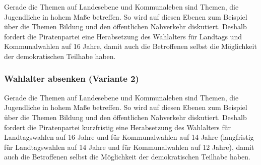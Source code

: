 Gerade die Themen auf Landesebene und Kommunaleben sind Themen, die Jugendliche in hohem Maße betreffen. So wird auf diesen Ebenen zum Beispiel über die Themen Bildung und den öffentlichen Nahverkehr diskutiert. Deshalb fordert die Piratenpartei eine Herabsetzung des Wahlalters für Landtags und Kommunalwahlen auf 16 Jahre, damit auch die Betroffenen selbst die Möglichkeit der demokratischen Teilhabe haben.

\subsubsection{Wahlalter absenken (Variante 2)}
\abstimmung
Gerade die Themen auf Landesebene und Kommunaleben sind Themen, die Jugendliche in hohem Maße betreffen. So wird auf diesen Ebenen zum Beispiel über die Themen Bildung und den öffentlichen Nahverkehr diskutiert. Deshalb fordert die Piratenpartei kurzfristig eine Herabsetzung des Wahlalters für Landtagswahlen auf 16 Jahre und für Kommunalwahlen auf 14 Jahre (langfristig für Landtagswahlen auf 14 Jahre und für Kommunalwahlen auf 12 Jahre), damit auch die Betroffenen selbst die Möglichkeit der demokratischen Teilhabe haben.
